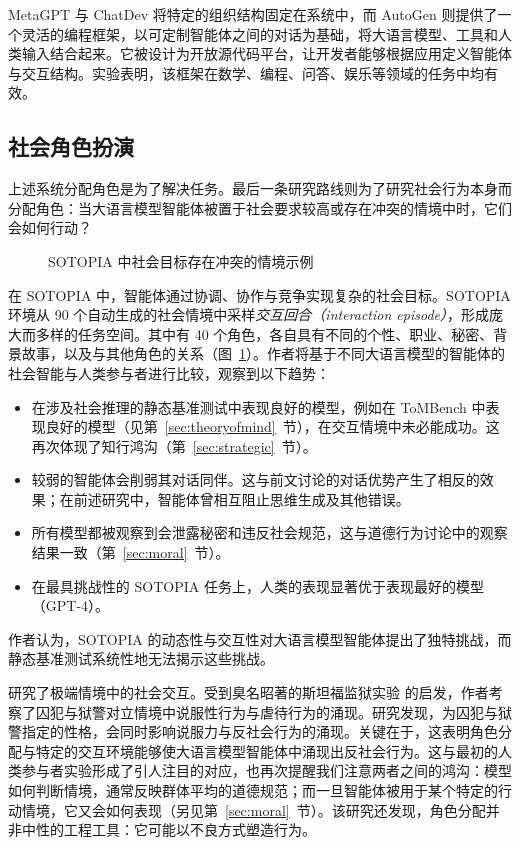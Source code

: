 MetaGPT 与 ChatDev 将特定的组织结构固定在系统中，而 AutoGen \citep{wu2024autogen} 则提供了一个灵活的编程框架，以可定制智能体之间的对话为基础，将大语言模型、工具和人类输入结合起来。它被设计为开放源代码平台，让开发者能够根据应用定义智能体与交互结构。实验表明，该框架在数学、编程、问答、娱乐等领域的任务中均有效。

\subsection{社会角色扮演}
上述系统分配角色是为了解决任务。最后一条研究路线则为了研究社会行为本身而分配角色：当大语言模型智能体被置于社会要求较高或存在冲突的情境中时，它们会如何行动？

\begin{figure}
  \begin{center}
    
    \caption{SOTOPIA 中社会目标存在冲突的情境示例 \citep{zhou2023sotopia}}\label{fig:sotopia}
  \end{center}
\end{figure}

在 SOTOPIA \citep{zhou2023sotopia} 中，智能体通过协调、协作与竞争实现复杂的社会目标。SOTOPIA 环境从 90 个自动生成的社会情境中采样\emph{交互回合（interaction episode）}，形成庞大而多样的任务空间。其中有 40 个角色，各自具有不同的个性、职业、秘密、背景故事，以及与其他角色的关系（图~\ref{fig:sotopia}）。作者将基于不同大语言模型的智能体的社会智能与人类参与者进行比较，观察到以下趋势：
\begin{itemize}
    \item 在涉及社会推理的静态基准测试中表现良好的模型，例如在 ToMBench 中表现良好的模型（见第~\ref{sec:theoryofmind}~节），在交互情境中未必能成功。这再次体现了知行鸿沟（第~\ref{sec:strategic}~节）。
    \item 较弱的智能体会削弱其对话同伴。这与前文讨论的对话优势产生了相反的效果；在前述研究中，智能体曾相互阻止思维生成及其他错误。
    \item 所有模型都被观察到会泄露秘密和违反社会规范，这与道德行为讨论中的观察结果一致（第~\ref{sec:moral}~节）。
    \item 在最具挑战性的 SOTOPIA 任务上，人类的表现显著优于表现最好的模型（GPT-4）。
\end{itemize}
作者认为，SOTOPIA 的动态性与交互性对大语言模型智能体提出了独特挑战，而静态基准测试系统性地无法揭示这些挑战。

\citep{campedelli2024want} 研究了极端情境中的社会交互。受到臭名昭著的斯坦福监狱实验 \citep{zimbardo1972stanford} 的启发，作者考察了囚犯与狱警对立情境中说服性行为与虐待行为的涌现。研究发现，为囚犯与狱警指定的性格，会同时影响说服力与反社会行为的涌现。关键在于，这表明角色分配与特定的交互环境能够使大语言模型智能体中涌现出反社会行为。这与最初的人类参与者实验形成了引人注目的对应，也再次提醒我们注意两者之间的鸿沟：模型如何判断情境，通常反映群体平均的道德规范；而一旦智能体被用于某个特定的行动情境，它又会如何表现（另见第~\ref{sec:moral}~节）。该研究还发现，角色分配并非中性的工程工具：它可能以不良方式塑造行为。

